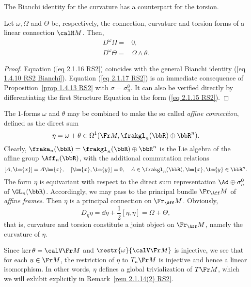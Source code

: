The Bianchi identity for the curvature has a counterpart for the torsion.

\begin{prop}\label{prop 2.1.13 RS2}
    Let $\omega,\Omega$ and $\Theta$ be, respectively, the connection, curvature and torsion forms of a linear connection $\calH M$. Then,
    \begin{align}
        D^\omega\Omega=&0,\label{eq 2.1.16 RS2}\\
        D^\omega\Theta=&\Omega\wedge\theta.\label{eq 2.1.17 RS2}
    \end{align}
\end{prop}
\begin{proof}
    Equation (\ref{eq 2.1.16 RS2}) coincides with the general Bianchi identity (\ref{eq 1.4.10 RS2 Bianchi}). Equation (\ref{eq 2.1.17 RS2}) is an immediate consequence of Proposition~\ref{prop 1.4.13 RS2} with $\sigma=\sigma_n^0$. It can also be verified directly by differentiating the first Structure Equation in the form (\ref{eq 2.1.15 RS2}).
\end{proof}


\begin{rem}\label{rem 2.1.14(1) RS2}
    The $1$-forms $\omega$ and $\theta$  may be combined to make the so called \emph{affine connection}, defined as the direct sum
    \[\eta=\omega+\theta\in \Omega^1(\Fr M,\frakgl_n(\bbR)\oplus\bbR^n).\]
    Clearly, $\fraka_n(\bbR)=\frakgl_n(\bbR)\oplus \bbR^n$ is the Lie algebra of the affine group $\Aff_n(\bbR)$, with the additional commutation relations
    \[[A,\bm{x}]=A\bm{x},\quad [\bm{x},\bm{y}]=0,\quad A\in\frakgl_n(\bbR),\bm{x},\bm{y}\in\bbR^n.\]
    The form $\eta$ is equivariant with respect to the direct sum representation $\Ad\oplus \sigma_n^0$ of $\GL_n(\bbR)$. Accordingly, we may pass to the principal bundle $\Fr_{\Aff} M$ of \emph{affine frames}. Then $\eta$ is a principal connection on $\Fr_{\Aff}M$. Obviously,
    \[D_{\eta}\eta=\dd \eta+\frac12[\eta,\eta]=\Omega+\Theta,\]
    that is, curvature and torsion constitute a joint object on $\Fr_{\Aff} M$, namely the curvature of $\eta$.

    Since $\ker\theta=\calV \Fr M$ and $\restr{\omega}{\calV \Fr M}$ is injective, we see that for each $u\in\Fr M$, the restriction of $\eta$ to $T_u \Fr M$ is injective and hence a linear isomorphism. In other words, $\eta$ defines a global trivialization of $T\Fr M$, which we will exhibit explicitly in Remark~\ref{rem 2.1.14(2) RS2}.
\end{rem}

